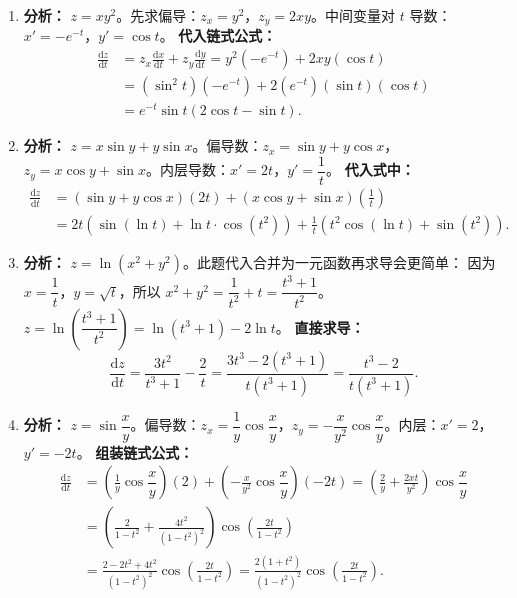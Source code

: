 \documentclass[lang=cn,11pt]{elegantbook}
\begin{document}
\begin{solution}
\begin{enumerate}
  \item[(1)] \textbf{分析：} $z=xy^2$。先求偏导：$z_x = y^2$，$z_y = 2xy$。中间变量对 $t$ 导数：$x' = -e^{-t}$，$y' = \cos t$。
  \textbf{代入链式公式：}
  \begin{align*}
  \frac{\mathrm{d}z}{\mathrm{d}t} &= z_x\frac{\mathrm{d}x}{\mathrm{d}t} + z_y\frac{\mathrm{d}y}{\mathrm{d}t} = y^2(-e^{-t}) + 2xy(\cos t) \\
  &= (\sin^2 t)(-e^{-t}) + 2(e^{-t})(\sin t)(\cos t) \\
  &= e^{-t}\sin t(2\cos t - \sin t).
  \end{align*}

  \item[(2)] \textbf{分析：} $z=x\sin y + y\sin x$。偏导数：$z_x = \sin y + y\cos x$，$z_y = x\cos y + \sin x$。内层导数：$x' = 2t$，$y' = \dfrac{1}{t}$。
  \textbf{代入式中：}
  \begin{align*}
  \frac{\mathrm{d}z}{\mathrm{d}t} &= (\sin y + y\cos x)(2t) + (x\cos y + \sin x)\left(\frac{1}{t}\right) \\
  &= 2t(\sin(\ln t) + \ln t\cdot \cos(t^2)) + \frac{1}{t}(t^2\cos(\ln t) + \sin(t^2)).
  \end{align*}

  \item[(3)] \textbf{分析：} $z=\ln(x^2+y^2)$。此题代入合并为一元函数再求导会更简单：
  因为 $x = \dfrac{1}{t}$，$y = \sqrt{t}$，所以 $x^2+y^2 = \dfrac{1}{t^2} + t = \dfrac{t^3+1}{t^2}$。
  $z = \ln\left(\dfrac{t^3+1}{t^2}\right) = \ln(t^3+1) - 2\ln t$。
  \textbf{直接求导：}
  \[
  \frac{\mathrm{d}z}{\mathrm{d}t} = \frac{3t^2}{t^3+1} - \frac{2}{t} = \frac{3t^3 - 2(t^3+1)}{t(t^3+1)} = \frac{t^3-2}{t(t^3+1)}.
  \]

  \item[(4)] \textbf{分析：} $z=\sin\dfrac{x}{y}$。偏导数：$z_x = \dfrac{1}{y}\cos\dfrac{x}{y}$，$z_y = -\dfrac{x}{y^2}\cos\dfrac{x}{y}$。内层：$x'=2$，$y'=-2t$。
  \textbf{组装链式公式：}
  \begin{align*}
  \frac{\mathrm{d}z}{\mathrm{d}t} &= \left(\frac{1}{y}\cos\dfrac{x}{y}\right)(2) + \left(-\frac{x}{y^2}\cos\dfrac{x}{y}\right)(-2t) 
  = \left(\frac{2}{y} + \frac{2xt}{y^2}\right)\cos\dfrac{x}{y} \\
  &= \left(\frac{2}{1-t^2} + \frac{4t^2}{(1-t^2)^2}\right)\cos\left(\frac{2t}{1-t^2}\right) \\
  &= \frac{2-2t^2+4t^2}{(1-t^2)^2}\cos\left(\frac{2t}{1-t^2}\right) = \frac{2(1+t^2)}{(1-t^2)^2}\cos\left(\frac{2t}{1-t^2}\right).
  \end{align*}


\end{enumerate}
\end{solution}
\end{document}
